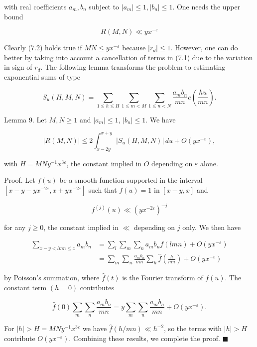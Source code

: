\documentclass[10pt]{article}
\newcommand{\proofend}{\hfill\(\blacksquare\)}
\begin{document}
with real coefficients $a_{m}, b_{n}$ subject to $\left|a_{m}\right| \leqslant 1,\left|b_{n}\right| \leqslant 1$. One needs the upper bound


\begin{equation*}
R(M,N)\ll yx^{-\varepsilon} \tag{7.2}
\end{equation*}


Clearly (7.2) holds true if $M N \leqslant y x^{-\varepsilon}$ because $\left|r_{d}\right| \leqslant 1$. However, one can do better by taking into account a cancellation of terms in (7.1) due to the variation in sign of $r_{d}$. The following lemma transforms the problem to estimating exponential sums of type

$$
S_u(H,M,N)=\sum_{1 \leqslant h \leqslant H} \sum_{1 \leqslant m<M} \sum_{1\leqslant n<N} \frac{a_{m} b_{n}}{m n} e\left(\frac{hu}{mn}\right) .
$$

Lemma 9. Let $M,N\geqslant1$ and $|a_m|\leqslant1$, $|b_n|\leqslant1$.
We have

$$
|R(M,N)|\leqslant2\int_{x-2y}^{x+y}|S_u(H,M,N)|\,du
+O\left(yx^{-\varepsilon}\right),
$$

with $H=MNy^{-1}x^{3\varepsilon}$, the constant implied in $O$ depending
on $\varepsilon$ alone.

Proof. Let $f(u)$ be a smooth function supported in the interval
$[x-y-yx^{-2\varepsilon},x+yx^{-2\varepsilon}]$ such that $f(u)=1$ in
$[x-y,x]$ and

$$
f^{(j)}(u)\ll\left(yx^{-2\varepsilon}\right)^{-j}
$$

for any $j\geqslant0$, the constant implied in $\ll$ depending on $j$ only.
We then have

$$
\begin{aligned}
\sum_{x-y<lmn\leqslant x}a_mb_n
&=\sum_l\sum_m\sum_n a_mb_nf(lmn)+O\left(yx^{-\varepsilon}\right)\\
&=\sum_m\sum_n\frac{a_mb_n}{mn}\sum_h
\widehat f\left(\frac{h}{mn}\right)+O\left(yx^{-\varepsilon}\right)
\end{aligned}
$$

by Poisson's summation, where $\widehat f(t)$ is the Fourier transform of
$f(u)$. The constant term $(h=0)$ contributes

$$
\widehat f(0)\sum_m\sum_n\frac{a_mb_n}{mn}
=y\sum_m\sum_n\frac{a_mb_n}{mn}+O\left(yx^{-\varepsilon}\right).
$$

For $|h|>H=MNy^{-1}x^{3\varepsilon}$ we have
$\widehat f(h/mn)\ll h^{-2}$, so the terms with $|h|>H$ contribute
$O(yx^{-\varepsilon})$. Combining these results, we complete the proof.
\proofend
\end{document}
